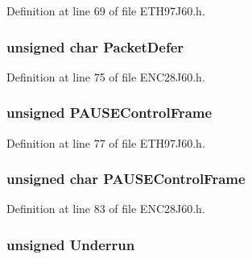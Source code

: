 Definition at line 69 of file E\+T\+H97\+J60.\+h.

\hypertarget{union_t_x_s_t_a_t_u_s_aff506930595282ba024813cef4159e04}{}
\subsubsection[{Packet\+Defer}]{\setlength{\rightskip}{0pt plus 5cm}unsigned char Packet\+Defer}\label{union_t_x_s_t_a_t_u_s_aff506930595282ba024813cef4159e04}


Definition at line 75 of file E\+N\+C28\+J60.\+h.

\hypertarget{union_t_x_s_t_a_t_u_s_ae137eb12f645dd32d27cf5daa594c6ee}{}
\subsubsection[{P\+A\+U\+S\+E\+Control\+Frame}]{\setlength{\rightskip}{0pt plus 5cm}unsigned P\+A\+U\+S\+E\+Control\+Frame}\label{union_t_x_s_t_a_t_u_s_ae137eb12f645dd32d27cf5daa594c6ee}


Definition at line 77 of file E\+T\+H97\+J60.\+h.

\hypertarget{union_t_x_s_t_a_t_u_s_ae892240857d9c5efd7225fec7f8a4e21}{}
\subsubsection[{P\+A\+U\+S\+E\+Control\+Frame}]{\setlength{\rightskip}{0pt plus 5cm}unsigned char P\+A\+U\+S\+E\+Control\+Frame}\label{union_t_x_s_t_a_t_u_s_ae892240857d9c5efd7225fec7f8a4e21}


Definition at line 83 of file E\+N\+C28\+J60.\+h.

\hypertarget{union_t_x_s_t_a_t_u_s_aacd14a40f609fdbfc1b546432b9d7a8e}{}
\subsubsection[{Underrun}]{\setlength{\rightskip}{0pt plus 5cm}unsigned Underrun}\label{union_t_x_s_t_a_t_u_s_aacd14a40f609fdbfc1b546432b9d7a8e}


